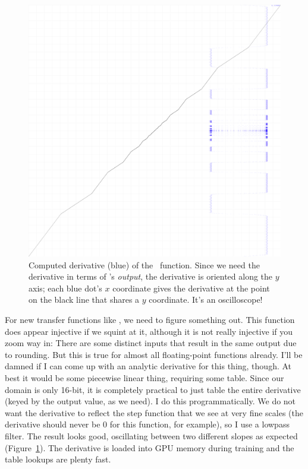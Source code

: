 \documentclass[twocolumn]{article}
\begin{document}
\begin{figure}
  \begin{center}
    \includegraphics[width=0.65 \linewidth]{grad1oscilloscope}
  \end{center}
  \caption{
    Computed derivative (blue) of the \gradone\ function. Since we need
    the derivative in terms of \gradone's {\em output}, the
    derivative is oriented along the $y$ axis; each blue dot's $x$ coordinate
    gives the derivative at the point on the black line that shares a $y$
    coordinate. It's an oscilloscope!
  } \label{fig:grad1oscilloscope}
\end{figure}

For new transfer functions like \gradone, we need to figure something
out. This function does appear injective if we squint at it, although
it is not really injective if you zoom way in: There are
some distinct inputs that result in the same output due to rounding.
But this is true for almost all floating-point functions already.
I'll be damned if I can come up with an analytic derivative for this
thing, though. At best it would be some piecewise linear thing, requiring
some table. Since our domain is only 16-bit, it is completely practical
to just table the entire derivative (keyed by the output value, as we need).
I do this programmatically. We do not want the derivative to reflect
the step function that we see at very fine scales (the derivative should
never be 0 for this function, for example), so I use a lowpass
filter. The result looks good, oscillating between two different slopes
as expected (Figure~\ref{fig:grad1oscilloscope}). The derivative
is loaded into GPU memory during training and the table lookups are
plenty fast.
\end{document}
